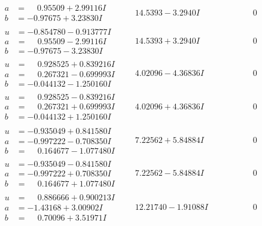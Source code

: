 \documentclass[1p]{elsarticle_modified}
\theoremstyle{definition}
\begin{document}
$$\begin{array}{c|c|c}
\begin{aligned}
a &= \phantom{-}0.95509 + 2.99116 I \\
b &= -0.97675 + 3.23830 I\end{aligned}
 & \phantom{-}14.5393 - 3.2940 I & \phantom{-0.000000 } 0 \\ \hline\begin{aligned}
u &= -0.854780 - 0.913777 I \\
a &= \phantom{-}0.95509 - 2.99116 I \\
b &= -0.97675 - 3.23830 I\end{aligned}
 & \phantom{-}14.5393 + 3.2940 I & \phantom{-0.000000 } 0 \\ \hline\begin{aligned}
u &= \phantom{-}0.928525 + 0.839216 I \\
a &= \phantom{-}0.267321 - 0.699993 I \\
b &= -0.044132 - 1.250160 I\end{aligned}
 & \phantom{-}4.02096 - 4.36836 I & \phantom{-0.000000 } 0 \\ \hline\begin{aligned}
u &= \phantom{-}0.928525 - 0.839216 I \\
a &= \phantom{-}0.267321 + 0.699993 I \\
b &= -0.044132 + 1.250160 I\end{aligned}
 & \phantom{-}4.02096 + 4.36836 I & \phantom{-0.000000 } 0 \\ \hline\begin{aligned}
u &= -0.935049 + 0.841580 I \\
a &= -0.997222 - 0.708350 I \\
b &= \phantom{-}0.164677 - 1.077480 I\end{aligned}
 & \phantom{-}7.22562 + 5.84884 I & \phantom{-0.000000 } 0 \\ \hline\begin{aligned}
u &= -0.935049 - 0.841580 I \\
a &= -0.997222 + 0.708350 I \\
b &= \phantom{-}0.164677 + 1.077480 I\end{aligned}
 & \phantom{-}7.22562 - 5.84884 I & \phantom{-0.000000 } 0 \\ \hline\begin{aligned}
u &= \phantom{-}0.886666 + 0.900213 I \\
a &= -1.43168 + 3.00902 I \\
b &= \phantom{-}0.70096 + 3.51971 I\end{aligned}
 & \phantom{-}12.21740 - 1.91088 I & \phantom{-0.000000 } 0\\

\end{array}$$
\end{document}
